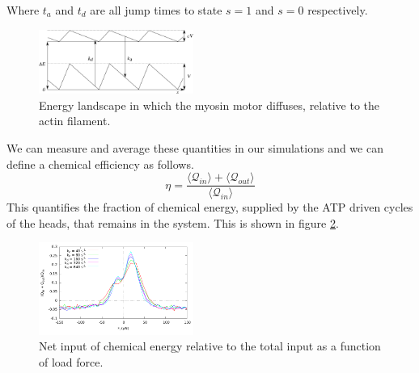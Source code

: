 \documentclass[aps,pre,twocolumn,showpacs,showkeys,a4paper]{revtex4}
\begin{document}
Where $t_a$ and $t_d$ are all jump times to state $s=1$ and $s=0$ respectively. 
\begin{figure}[t]
\centering
\includegraphics[width=0.45\textwidth,height=!]{energy}
\caption{Energy landscape in which the myosin motor diffuses, relative to the actin filament.}
\label{Fig: energy}
\end{figure}
 We can measure and average these quantities in our simulations and we can define a chemical efficiency as follows.
\begin{equation}
\eta = \frac{\langle\mathcal Q_{in}\rangle+\langle\mathcal Q_{out}\rangle}{\langle\mathcal Q_{in}\rangle}
\end{equation}
This quantifies the fraction of chemical energy, supplied by the ATP driven cycles of the heads, that remains in the system. 
This is shown in figure \ref{Fig: chem}.
\begin{figure}[b]
\centering
\includegraphics[width=0.45\textwidth,height=!]{chemical_cycle}
\caption{Net input of chemical energy relative to the total input as a function of load force.}
\label{Fig: chem}
\end{figure}
\end{document}
